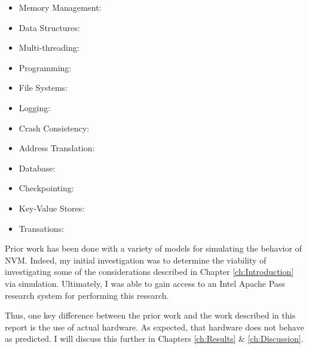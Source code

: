 \begin{itemize}

    \item Memory Management:\cite{volos2011mnemosyne,Oukid:2017:MMT:3137628.3137629,yu2017redesign}
    \item Data Structures:\cite{Friedman:2018:PLQ:3178487.3178490,Memaripour:2017:AIU:3064176.3064215,lee2017wort,sha2018towards,zhang2018simpo,
kim2018clfb,wang2018persisting,nawab2017dali,lee2018write,oukid2017data,venkataraman2011consistent,chen2015persistent,222591,
zuo2017write,zuo2018write}
    \item Multi-threading: \cite{Hsu:2017:NPP:3064176.3064204}
    \item Programming: \cite{Kolli:2017:LP:3079856.3080229,Kolli:2017:LP:3140659.3080229,marathe2017persistent}
    \item File Systems:\cite{kannan2018designing,liu2018hmfs}
    \item Logging:\cite{Cohen:2017:ELN:3152284.3133891,shin2017proteus}
    \item Crash Consistency:\cite{Pillai:2017:ACC:3141876.3119897,wei2017transactional}
    \item Address Translation:\cite{Chen:2017:ESP:3123939.3124543,liu2017durable,wang2017hardware}
    \item Database:\cite{arulraj2017build,Oukid:2014:SHS:2619228.2619236,arulraj2015let}
    \item Checkpointing: \cite{zhang2017fine,giles2017continuous}
    \item Key-Value Stores:\cite{huang2018nvht,chen2017udorn,kim2017papyruskv,liu2017librekv,zhou2016nvht,wu2016nvmcached}
    \item Transations:\cite{marathe2018persistent}
\end{itemize}

Prior work has been done with a variety of models for simulating the behavior of \acs{NVM}.  Indeed, my
initial investigation was to determine the viability of investigating some of the considerations described
in Chapter \ref{ch:Introduction} via simulation.  Ultimately, I was able to gain access to an Intel Apache
Pass research system for performing this research.

Thus, one key difference between the prior work and the work described in this report is the use of actual
hardware.  As expected, that hardware does not behave as predicted.  I will discuss this further in Chapters \ref{ch:Results}
\& \ref{ch:Discussion}. 

\endinput

